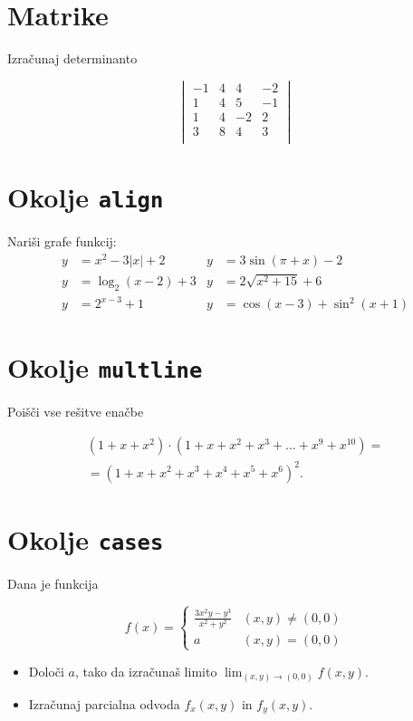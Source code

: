 \documentclass[a4paper,12pt]{article}
\begin{document}
\section*{Matrike}
Izračunaj determinanto



   \[\begin{vmatrix}
      -1 & 4 & 4 & -2 \\
      1 & 4 & 5 & -1 \\
      1 & 4 & -2 & 2 \\
      3 & 8 & 4 & 3 \\
   \end{vmatrix}\]

\section*{Okolje \texttt{align}}
Nariši grafe funkcij:
   \begin{align*}
      y &= x^2 - 3|x| + 2  &  y &= 3 \sin(\pi+x) - 2 \\
      y &= \log_2(x-2) + 3 &  y &= 2 \sqrt{x^2+15} + 6 \\
      y &= 2^{x-3} + 1     &  y &= \cos(x-3) + \sin^2(x+1)
   \end{align*}

\section*{Okolje \texttt{multline}}
Poišči vse rešitve enačbe

\begin{multline*}
   (1+x+x^2) \cdot (1+x+x^2+x^3+\ldots+x^9+x^{10}) = \\
   =(1+x+x^2+x^3+x^4+x^5+x^6)^2.
\end{multline*}

\section*{Okolje \texttt{cases}}
Dana je funkcija

\[f(x)=
\begin{cases}
   \frac{3x^2y-y^3}{x^2+y^2} & (x,y)\neq (0,0) \\
   a & (x,y)=(0,0)
\end{cases}\]

\begin{itemize}
\item Določi \(a\), tako da izračunaš limito \( \lim_{(x,y)\to(0,0)} f(x,y) \).
\item Izračunaj parcialna odvoda \(f_x(x,y)\) in \(f_y(x,y)\).
\end{itemize}
\end{document}
